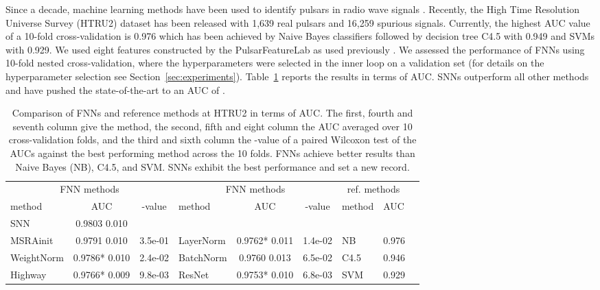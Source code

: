 \documentclass{article}
\begin{document}
Since a decade, machine learning methods have been used to identify pulsars in radio wave signals \citep{bib:Lyon2016a}.
Recently, the High Time Resolution Universe Survey (HTRU2) dataset has been released with
1,639 real pulsars and 16,259 spurious signals.
Currently, the highest AUC value of a 10-fold cross-validation is 0.976
which has been achieved by Naive Bayes classifiers followed by decision tree C4.5 with 0.949 and SVMs with 0.929.
We used eight features constructed by the PulsarFeatureLab as used previously \citep{bib:Lyon2016a}.
We assessed the performance of FNNs using 10-fold nested cross-validation,
where the hyperparameters were selected in the inner loop on a validation set (for details on the hyperparameter selection see Section~\ref{sec:experiments}). 
Table~\ref{tab:HTRU2} reports the results
in terms of AUC. SNNs outperform all other methods and have pushed the state-of-the-art 
to an AUC of . 


\begin{table}[ht]
\caption[Comparison of FNNs and reference methods at HTRU2]{Comparison of FNNs and reference methods at HTRU2 
in terms of AUC. 
The first, fourth and seventh column give the method, 
the second, fifth and eight column the AUC averaged over 10 cross-validation folds, 
and the third and sixth column the -value of a paired Wilcoxon test of the AUCs against 
the best performing method across the 10 folds. 
FNNs achieve better results than Naive Bayes (NB), C4.5, and SVM.
SNNs exhibit the best performance and set a new record. \label{tab:HTRU2}}
\centering
\begin{tabular}{lcclccllc}
  \toprule
  \multicolumn{3}{c}{FNN methods}   &  \multicolumn{3}{c}{FNN methods} & \multicolumn{2}{c}{ref. methods}  \\
   method &  AUC & -value & method &  AUC & -value & method &  AUC  \\ 
  \midrule
  SNN           &    0.9803 \tiny   0.010 &    & & & & &                     \\ 
  MSRAinit      & 0.9791  \tiny   0.010 & \tiny3.5e-01       &  LayerNorm  & 0.9762* \tiny   0.011 & \tiny { 1.4e-02}     & NB &0.976      \\ 
  WeightNorm    & 0.9786*         \tiny   0.010 & \tiny{ 2.4e-02} &  BatchNorm  & 0.9760 \tiny   0.013 & \tiny 6.5e-02                & C4.5 & 0.946  \\ 
  Highway       & 0.9766*         \tiny   0.009 & \tiny{ 9.8e-03} & ResNet & 0.9753* \tiny  0.010 & \tiny 6.8e-03       & SVM  & 0.929\\ 
   \bottomrule
\end{tabular}
\end{table}
\end{document}
